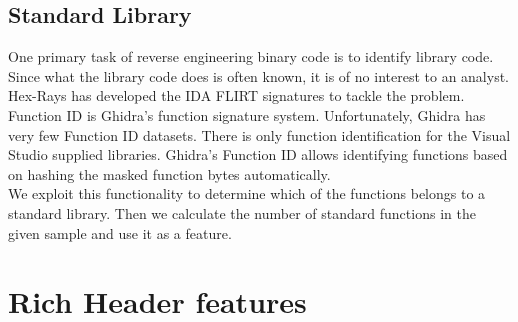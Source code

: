 \subsection{Standard Library}

One primary task of reverse engineering binary code is to identify library code. Since what the library code does is often known, it is of no interest to an analyst. Hex-Rays has developed the IDA FLIRT signatures to tackle the problem. Function ID is Ghidra's function signature system. Unfortunately, Ghidra has very few Function ID datasets. There is only function identification for the Visual Studio supplied libraries. Ghidra's Function ID allows identifying functions based on hashing the masked function bytes automatically.\cite{ghidra_fid}\\

We exploit this functionality to determine which of the functions belongs to a standard library. Then we calculate the number of standard functions in the given sample and use it as a feature.

\section{Rich Header features}